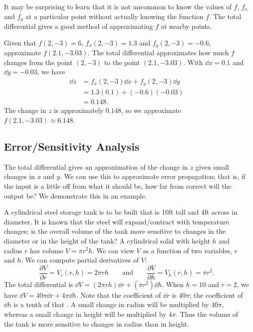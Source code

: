 It may be surprising to learn that it is not uncommon to know the values of $f$, $f_x$ and $f_y$ at a particular point without actually knowing the function $f$. The total differential gives a good method of approximating $f$ at nearby points.

\begin{example}\label{ex_totaldiff3}%
Given that $f(2,-3) = 6$, $f_x(2,-3) = 1.3$ and $f_y(2,-3) = -0.6$, approximate $f(2.1,-3.03)$.
\solution
The total differential approximates how much $f$ changes from the point $(2,-3)$ to the point $(2.1,-3.03)$. With $\dd x = 0.1$ and $\dd y = -0.03$, we have
\begin{align*}
\dd z &= f_x(2,-3)\dd x + f_y(2,-3)\dd y\\
		&= 1.3(0.1) + (-0.6)(-0.03) \\
		&= 0.148.
\end{align*}
The change in $z$ is approximately $0.148$, so we approximate $f(2.1,-3.03)\approx 6.148$.
\end{example}

\subsection{Error/Sensitivity Analysis}

The total differential gives an approximation of the change in $z$ given small changes in $x$ and $y$. We can use this to approximate error propagation; that is, if the input is a little off from what it should be, how far from correct will the output be? We demonstrate this in an example.

\begin{example}\label{ex_totaldiff4}%
A cylindrical steel storage tank is to be built that is 10ft tall and 4ft across in diameter. It is known that the steel will expand/contract with temperature changes; is the overall volume of the tank more sensitive to changes in the diameter or in the height of the tank?
\solution
A cylindrical solid with height $h$ and radius $r$ has volume $V = \pi r^2h$. We can view $V$ as a function of two variables, $r$ and $h$. We can compute partial derivatives of $V$:
\[\frac{\partial V}{\partial r} = V_r(r,h) = 2\pi rh \qquad \text{and}\qquad \frac{\partial V}{\partial h} = V_h(r,h) = \pi r^2.\]
The total differential is $\dd V = (2\pi rh)\dd r + (\pi r^2)\dd h.$ When $h = 10$ and $r = 2$, we have $\dd V = 40\pi \dd r + 4\pi \dd h$.
Note that the coefficient of $\dd r$ is $40\pi%
$; the coefficient of $\dd h$ is a tenth of that%
. A small change in radius will be multiplied by $40\pi$, whereas a small change in height will be multiplied by $4\pi$. Thus the volume of the tank is more sensitive to changes in radius than in height.
\end{example}

